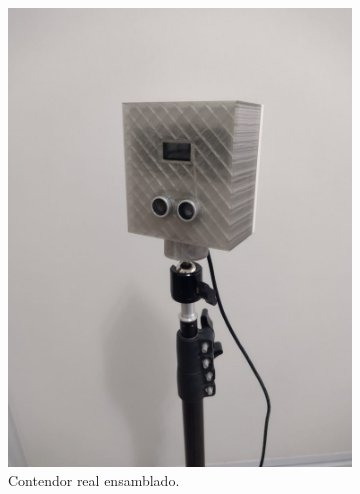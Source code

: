 \begin{figure}[bth]
    \centering
    \begin{subfigure}{.45\textwidth}
        \centering
        \includegraphics[width=\textwidth]{imgs/contenedor-real.jpeg}
        \caption{Contendor real ensamblado.}
    \end{subfigure}
    \begin{subfigure}{.45\textwidth}
        \centering

\end{subfigure}
\end{figure}
